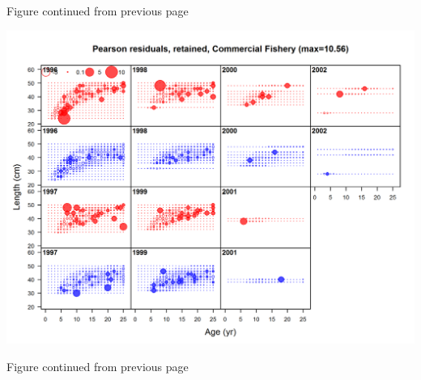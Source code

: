 \documentclass[12pt,]{article}
\begin{document}
\begin{center} 

            Figure continued from previous page 

            \end{center}

\includegraphics{./r4ss/plots_mod2/comp_condAALfit_residsflt2mkt2_page3.png}

\begin{center} 

            Figure continued from previous page 

            \end{center}
\end{document}
